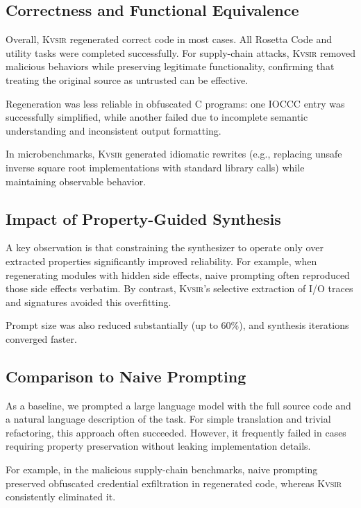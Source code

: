 \documentclass[sigplan,review,anonymous,10pt]{acmart}
\newcommand{\sys}{{\scshape Kv{\textalpha}sir}\xspace}
\begin{document}
\subsection{Correctness and Functional Equivalence}

Overall, \sys regenerated correct code in most cases. All Rosetta Code and utility tasks were completed successfully. For supply-chain attacks, \sys removed malicious behaviors while preserving legitimate functionality, confirming that treating the original source as untrusted can be effective. 

Regeneration was less reliable in obfuscated C programs: one IOCCC entry was successfully simplified, while another failed due to incomplete semantic understanding and inconsistent output formatting.

In microbenchmarks, \sys generated idiomatic rewrites (e.g., replacing unsafe inverse square root implementations with standard library calls) while maintaining observable behavior.

\subsection{Impact of Property-Guided Synthesis}

A key observation is that constraining the synthesizer to operate only over extracted properties significantly improved reliability. For example, when regenerating modules with hidden side effects, naive prompting often reproduced those side effects verbatim. By contrast, \sys’s selective extraction of I/O traces and signatures avoided this overfitting. 

Prompt size was also reduced substantially (up to 60\%), and synthesis iterations converged faster.

\subsection{Comparison to Naive Prompting}

As a baseline, we prompted a large language model with the full source code and a natural language description of the task. For simple translation and trivial refactoring, this approach often succeeded. However, it frequently failed in cases requiring property preservation without leaking implementation details. 

For example, in the malicious supply-chain benchmarks, naive prompting preserved obfuscated credential exfiltration in regenerated code, whereas \sys consistently eliminated it.
\end{document}
